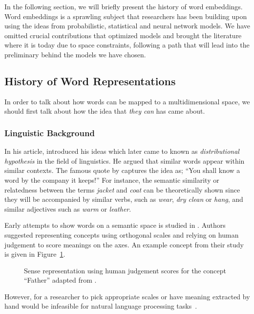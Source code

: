 In the following section, we will briefly present the history of word embeddings.
Word embeddings is a sprawling subject that researchers has been building upon using the ideas from probabilistic, statistical and neural network models.
We have omitted crucial contributions that optimized models and brought the literature where it is today due to space constraints, following a path that will lead into the preliminary behind the models we have chosen.

\subsection{History of Word Representations}%
\label{sub:history_of_word_representations}

In order to talk about how words can be mapped to a multidimensional space, we should first talk about how the idea that \emph{they can} has came about.

\subsubsection{Linguistic Background}%
\label{ssub:linguistic_background}

In his \citeyear{harris_distributional_1954} article, \textcite{harris_distributional_1954} introduced his ideas which later came to known as \emph{distributional hypothesis} in the field of linguistics.
He argued that similar words appear within similar contexts.
The famous quote by \textcite{firth_synopsis_1957} captures the idea as;
\enquote{You shall know a word by the company it keeps!}
For instance, the semantic similarity or relatedness between the terms \emph{jacket} and \emph{coat} can be theoretically shown since they will be accompanied by similar verbs, such as \emph{wear}, \emph{dry clean} or \emph{hang}, and similar adjectives such as \emph{warm} or \emph{leather}.

Early attempts to show words on a semantic space is studied in \textcite{osgood_measurement_1957}.
Authors suggested representing concepts using orthogonal scales and relying on human judgement to score meanings on the axes.
An example concept from their study is given in Figure~\ref{fig:early_vectors}.
\begin{figure}[ht]
    \centering
    \caption{Sense representation using human judgement scores for the concept \enquote{Father} adapted from \textcite{osgood_measurement_1957}.}%
    \label{fig:early_vectors}
\end{figure}
However, for a researcher to pick appropriate scales or have meaning extracted by hand would be infeasible for natural language processing tasks~\cite{lund_producing_1996}.


